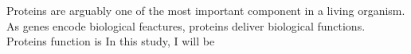 Proteins are arguably one of the most important component in a living organism. As genes encode biological feactures, proteins deliver biological functions. Proteins function is  In this study, I will be 